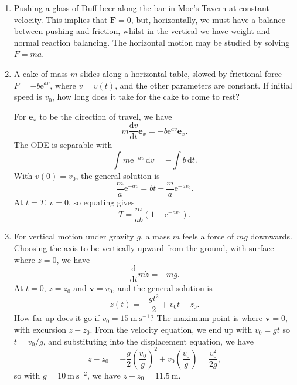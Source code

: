\documentclass[letter-paper]{tufte-book}
\newcommand{\eb}{\boldsymbol{e}}
\newcommand{\Fb}{\boldsymbol{F}}
\newcommand{\vb}{\boldsymbol{v}}
\newcommand{\ex}{\mathrm{e}}
\begin{document}
\begin{enumerate}
  \item Pushing a glass of Duff beer along the bar in Moe's Tavern at constant
  velocity. This implies that $\Fb = 0$, but, horizontally, we must have a
  balance between pushing and friction, whilst in the vertical we have weight
  and normal reaction balancing. The horizontal motion may be studied by solving
  $F = ma$.
  
  \item A cake of mass $m$ slides along a horizontal table, slowed by frictional
  force $F = -b\ex^{a v}$, where $v = v(t)$, and the other parameters are
  constant. If initial speed is $v_0$, how long does it take for the cake to
  come to rest?
  
  For $\eb_x$ to be the direction of travel, we have
  \begin{equation*}
    m\frac{\mathrm{d}v}{\mathrm{d}t}\eb_x = -b\ex^{av}\eb_x.
  \end{equation*}
  The ODE is separable with
  \begin{equation*}
    \int m\ex^{-av}\, \mathrm{d}v = -\int b\, \mathrm{d}t.
  \end{equation*}
  With $v(0) = v_0$, the general solution is
  \begin{equation*}
    \frac{m}{a}\ex^{-av} = bt + \frac{m}{a}\ex^{-av_0}.
  \end{equation*}
  At $t=T$, $v=0$, so equating gives
  \begin{equation*}
    T = \frac{m}{ab} \left(1 - \ex^{-av_0}\right).
  \end{equation*}
  
  \item For vertical motion under gravity $g$, a mass $m$ feels a force of $mg$
  downwards. Choosing the axis to be vertically upward from the ground, with
  surface where $z=0$, we have
  \begin{equation*}
    \frac{\mathrm{d}}{\mathrm{d}t} m\dot{z} = -mg.
  \end{equation*}
  At $t=0$, $z=z_0$ and $\vb = v_0$, and the general solution is
  \begin{equation*}
    z(t) = -\frac{gt^2}{2} + v_0 t + z_0.
  \end{equation*}
  How far up does it go if $v_0 = 15\ \mathrm{m}\ \mathrm{s}^{-1}$? The maximum
  point is where $\vb = 0$, with excursion $z - z_0$. From the velocity
  equation, we end up with $v_0 = gt$ so $t = v_0/g$, and substituting into the
  displacement equation, we have
  \begin{equation*}
    z - z_0 = -\frac{g}{2}\left(\frac{v_0}{g}\right)^2
      + v_0\left(\frac{v_0}{g}\right) = \frac{v_0^2}{2g},
  \end{equation*}
  so with $g = 10\ \mathrm{m}\ \mathrm{s}^{-2}$, we have $z - z_0 = 11.5\
  \mathrm{m}$.
  

\end{enumerate}
\end{document}
